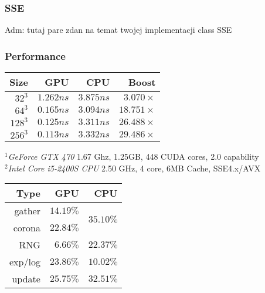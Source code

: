 \documentclass{beamer}
\begin{document}
\begin{frame}
\frametitle{SSE}

Adm: tutaj pare zdan na temat twojej implementacji class SSE
\end{frame}



\begin{frame} 

\frametitle{Performance}


\begin{center}
\def\arraystretch{1.1}%
\setlength{\tabcolsep}{1em}
\large
\begin{tabular}{ r r r | r }
    Size   & GPU\footnotemark & CPU\footnotemark & Boost \\
  \hline
   $32^3$  &  $1.262 ns$  &  $3.875 ns$  &  $3.070 \times$ \\
   $64^3$  &  $0.165 ns$  &  $3.094 ns$  & $18.751 \times$ \\
  $128^3$  &  $0.125 ns$  &  $3.311 ns$  & $26.488 \times$ \\
  $256^3$  &  $0.113 ns$  &  $3.332 ns$  & $29.486 \times$
\end{tabular}
\end{center}
\vfill
\small
$^1$\emph{GeForce GTX 470} 1.67 Ghz, 1.25GB, 448 CUDA cores, 2.0 capability\\
$^2$\emph{Intel Core i5-2400S CPU} 2.50 GHz, 4 core, 6MB Cache, SSE4.x/AVX

\end{frame}




\begin{frame} 
\begin{center}
\def\arraystretch{1.1}%
\setlength{\tabcolsep}{1em}
\large
\begin{tabular}{ r r r }
  Type      &     GPU      &  CPU \\
  \hline
  gather    &  $14.19 \%$  &  \multirow{2}{*}{$35.10 \%$} \\
  corona    &  $22.84 \%$  &  \\
  RNG       &  $ 6.66 \%$  &  $22.37 \%$ \\
  exp/log   &  $23.86 \%$  &  $10.02 \%$ \\
  update    &  $25.75 \%$  &  $32.51 \%$
\end{tabular}
\end{center}


\end{frame}
\end{document}
